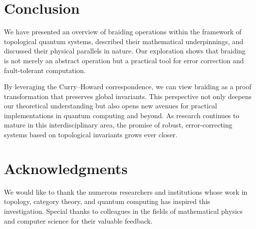 \documentclass[12pt]{article}
\begin{document}
\section{Conclusion}

We have presented an overview of braiding operations within the framework of topological quantum systems, described their mathematical underpinnings, and discussed their physical parallels in nature. Our exploration shows that braiding is not merely an abstract operation but a practical tool for error correction and fault-tolerant computation.

By leveraging the Curry–Howard correspondence, we can view braiding as a proof transformation that preserves global invariants. This perspective not only deepens our theoretical understanding but also opens new avenues for practical implementations in quantum computing and beyond. As research continues to mature in this interdisciplinary area, the promise of robust, error-correcting systems based on topological invariants grows ever closer.

\section*{Acknowledgments}
We would like to thank the numerous researchers and institutions whose work in topology, category theory, and quantum computing has inspired this investigation. Special thanks to colleagues in the fields of mathematical physics and computer science for their valuable feedback.
\end{document}
